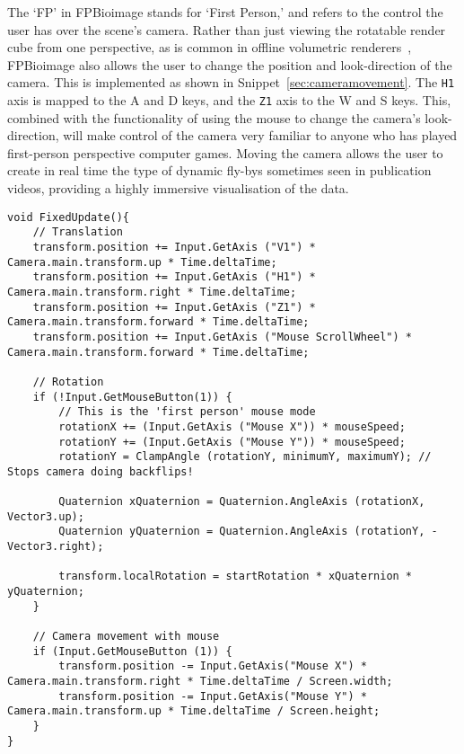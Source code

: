 The `FP' in FPBioimage stands for `First Person,' and refers to the control the user has over the scene's camera.
Rather than just viewing the rotatable render cube from one perspective, as is common in offline volumetric renderers~\cite{schindelin2012fiji, de2012icy, imaris}, FPBioimage also allows the user to change the position and look-direction of the camera.
This is implemented as shown in Snippet~\ref{sec:cameramovement}.
The \texttt{H1} axis is mapped to the A and D keys, and the \texttt{Z1} axis to the W and S keys.
This, combined with the functionality of using the mouse to change the camera's look-direction, will make control of the camera very familiar to anyone who has played first-person perspective computer games.
Moving the camera allows the user to create in real time the type of dynamic fly-bys sometimes seen in publication videos, providing a highly immersive visualisation of the data.

\begin{lstfloat}
\begin{lstlisting}[language={[Sharp]c}, label={sec:cameramovement}, caption={C\# code using built-in Unity functions for moving the camera in a first-person manner}]
void FixedUpdate(){
	// Translation
	transform.position += Input.GetAxis ("V1") * Camera.main.transform.up * Time.deltaTime;
	transform.position += Input.GetAxis ("H1") * Camera.main.transform.right * Time.deltaTime;
	transform.position += Input.GetAxis ("Z1") * Camera.main.transform.forward * Time.deltaTime;
	transform.position += Input.GetAxis ("Mouse ScrollWheel") * Camera.main.transform.forward * Time.deltaTime;

	// Rotation
	if (!Input.GetMouseButton(1)) {
		// This is the 'first person' mouse mode
		rotationX += (Input.GetAxis ("Mouse X")) * mouseSpeed;
		rotationY += (Input.GetAxis ("Mouse Y")) * mouseSpeed;
		rotationY = ClampAngle (rotationY, minimumY, maximumY); // Stops camera doing backflips!

		Quaternion xQuaternion = Quaternion.AngleAxis (rotationX, Vector3.up);
		Quaternion yQuaternion = Quaternion.AngleAxis (rotationY, -Vector3.right);

		transform.localRotation = startRotation * xQuaternion * yQuaternion;
	}

	// Camera movement with mouse
	if (Input.GetMouseButton (1)) {
		transform.position -= Input.GetAxis("Mouse X") * Camera.main.transform.right * Time.deltaTime / Screen.width;
		transform.position -= Input.GetAxis("Mouse Y") * Camera.main.transform.up * Time.deltaTime / Screen.height;
	}
}
\end{lstlisting}
\end{lstfloat}


